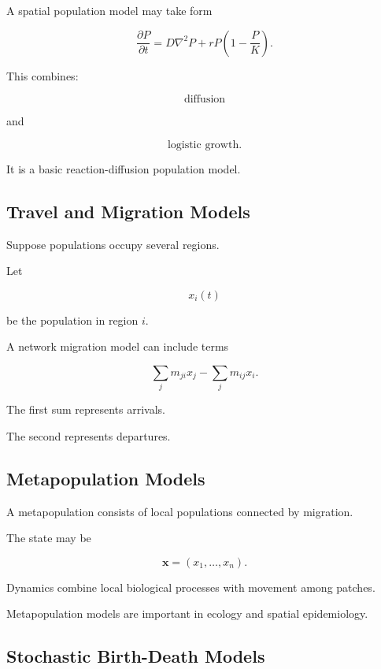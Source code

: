 A spatial population model may take form

\[
\boxed{
\frac{\partial P}{\partial t}
=
D\nabla^2P
+
rP
\left(
1-\frac{P}{K}
\right).
}
\]

This combines:

\[
\boxed{
\text{diffusion}
}
\]

and

\[
\boxed{
\text{logistic growth}.
}
\]

It is a basic reaction-diffusion population model.

\subsection{Travel and Migration Models}
\label{subsec:biological-migration-models}

Suppose populations occupy several regions.

Let

\[
x_i(t)
\]

be the population in region \(i\).

A network migration model can include terms

\[
\boxed{
\sum_j m_{ji}x_j
-
\sum_j m_{ij}x_i.
}
\]

The first sum represents arrivals.

The second represents departures.

\subsection{Metapopulation Models}
\label{subsec:metapopulation-models}

A metapopulation consists of local populations connected by migration.

The state may be

\[
\boxed{
\mathbf{x}
=
(x_1,\ldots,x_n).
}
\]

Dynamics combine local biological processes with movement among patches.

Metapopulation models are important in ecology and spatial epidemiology.

\subsection{Stochastic Birth-Death Models}
\label{subsec:stochastic-birth-death}

